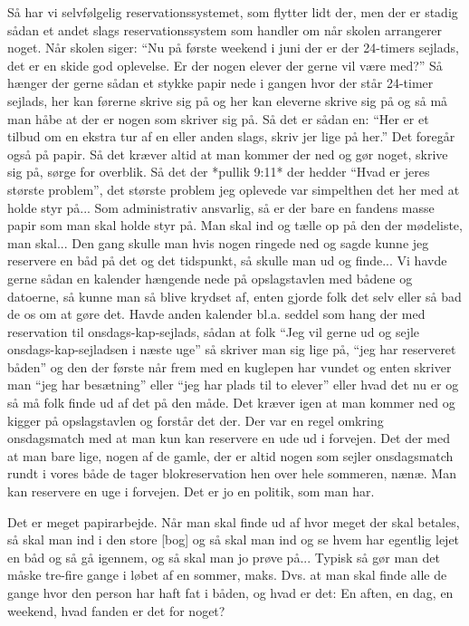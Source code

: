 Så har vi selvfølgelig reservationssystemet, som flytter lidt der, men der er stadig sådan et andet slags reservationssystem som handler om når skolen arrangerer noget. Når skolen siger: ``Nu på første weekend i juni der er der 24-timers sejlads, det er en skide god oplevelse. Er der nogen elever der gerne vil være med?'' Så hænger der gerne sådan et stykke papir nede i gangen hvor der står 24-timer sejlads, her kan førerne skrive sig på og her kan eleverne skrive sig på og så må man håbe at der er nogen som skriver sig på. Så det er sådan en: ``Her er et tilbud om en ekstra tur af en eller anden slags, skriv jer lige på her.'' Det foregår også på papir. Så det kræver altid at man kommer der ned og gør noget, skrive sig på, sørge for overblik. Så det der *pullik 9:11* der hedder ``Hvad er jeres største problem'', det største problem jeg oplevede var simpelthen det her med at holde styr på... Som administrativ ansvarlig, så er der bare en fandens masse papir som man skal holde styr på. Man skal ind og tælle op på den der mødeliste, man skal... Den gang skulle man hvis nogen ringede ned og sagde kunne jeg reservere en båd på det og det tidspunkt, så skulle man ud og finde... Vi havde gerne sådan en kalender hængende nede på opslagstavlen med bådene og datoerne, så kunne man så blive krydset af, enten gjorde folk det selv eller så bad de os om at gøre det. Havde anden kalender bl.a. seddel som hang der med reservation til onsdags-kap-sejlads, sådan at folk ``Jeg vil gerne ud og sejle onsdags-kap-sejladsen i næste uge'' så skriver man sig lige på, ``jeg har reserveret båden'' og den der første når frem med en kuglepen har vundet og enten skriver man ``jeg har besætning'' eller ``jeg har plads til to elever'' eller hvad det nu er og så må folk finde ud af det på den måde. Det kræver igen at man kommer ned og kigger på opslagstavlen og forstår det der. Der var en regel omkring onsdagsmatch med at man kun kan reservere en ude ud i forvejen. Det der med at man bare lige, nogen af de gamle, der er altid nogen som sejler onsdagsmatch rundt i vores både de tager blokreservation hen over hele sommeren, nænæ. Man kan reservere en uge i forvejen. Det er jo en politik, som man har. 

Det er meget papirarbejde. Når man skal finde ud af hvor meget der skal betales, så skal man ind i den store [bog] og så skal man ind og se hvem har egentlig lejet en båd og så gå igennem, og så skal man jo prøve på... Typisk så gør man det måske tre-fire gange i løbet af en sommer, maks. Dvs. at man skal finde alle de gange hvor den person har haft fat i båden, og hvad er det: En aften, en dag, en weekend, hvad fanden er det for noget? 

